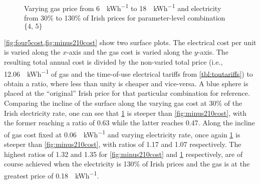 

\begin{figure}[htb]
    \centering
    \caption{Varying gas price from \qty{6}{\cents\per\kWh} to \qty{18}{\cents\per\kWh} and electricity from 30\% to 130\% of Irish prices for parameter-level combination $\{4\text{, }5\}$}
    \label{fig:four5cost}
\end{figure}

\cref{fig:four5cost,fig:minus210cost} show two surface plots. The electrical cost per unit is varied along the $x$-axis and the gas cost is varied along the $y$-axis. The resulting total annual cost is divided by the non-varied total price (i.e., \qty{12.06}{\cents\per\kWh} of gas and the time-of-use electrical tariffs from \cref{tbl:toutariffs}) to obtain a ratio, where less than unity is cheaper and vice-versa. A blue sphere is placed at the ``original'' Irish price for that particular combination for reference. Comparing the incline of the surface along the varying gas cost at 30\% of the Irish electricity rate, one can see that \cref{fig:four5cost} is steeper than \cref{fig:minus210cost}, with the former reaching a ratio of 0.63 while the latter reaches 0.47. Along the incline of gas cost fixed at \qty{0.06}{\EUR\per\kWh} and varying electricity rate, once again \cref{fig:four5cost} is steeper than \cref{fig:minus210cost}, with ratios of 1.17 and 1.07 respectively. The highest ratios of 1.32 and 1.35 for \cref{fig:minus210cost} and \cref{fig:four5cost} respectively, are of course achieved when the electricity is 130\% of Irish prices and the gas is at the greatest price of \qty{0.18}{\EUR\per\kWh}.

